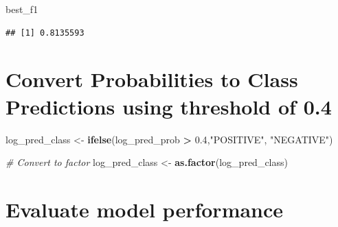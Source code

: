 \documentclass[
]{article}
\newenvironment{Shaded}{\begin{snugshade}}{\end{snugshade}}
\newcommand{\CommentTok}[1]{\textcolor[rgb]{0.56,0.35,0.01}{\textit{#1}}}
\newcommand{\FloatTok}[1]{\textcolor[rgb]{0.00,0.00,0.81}{#1}}
\newcommand{\FunctionTok}[1]{\textcolor[rgb]{0.13,0.29,0.53}{\textbf{#1}}}
\newcommand{\NormalTok}[1]{#1}
\newcommand{\OtherTok}[1]{\textcolor[rgb]{0.56,0.35,0.01}{#1}}
\newcommand{\SpecialCharTok}[1]{\textcolor[rgb]{0.81,0.36,0.00}{\textbf{#1}}}
\newcommand{\StringTok}[1]{\textcolor[rgb]{0.31,0.60,0.02}{#1}}
\begin{document}
\begin{Shaded}
\begin{Highlighting}[]
\NormalTok{best\_f1}
\end{Highlighting}
\end{Shaded}

\begin{verbatim}
## [1] 0.8135593
\end{verbatim}

\section{Convert Probabilities to Class Predictions using threshold of
0.4}\label{convert-probabilities-to-class-predictions-using-threshold-of-0.4}

\begin{Shaded}
\begin{Highlighting}[]
\NormalTok{log\_pred\_class }\OtherTok{\textless{}{-}} \FunctionTok{ifelse}\NormalTok{(log\_pred\_prob }\SpecialCharTok{\textgreater{}} \FloatTok{0.4}\NormalTok{,}\StringTok{"POSITIVE"}\NormalTok{, }\StringTok{"NEGATIVE"}\NormalTok{)}

\CommentTok{\# Convert to factor}
\NormalTok{log\_pred\_class }\OtherTok{\textless{}{-}} \FunctionTok{as.factor}\NormalTok{(log\_pred\_class)}
\end{Highlighting}
\end{Shaded}

\section{Evaluate model performance}\label{evaluate-model-performance}

\begin{Shaded}
\end{Shaded}
\end{document}
